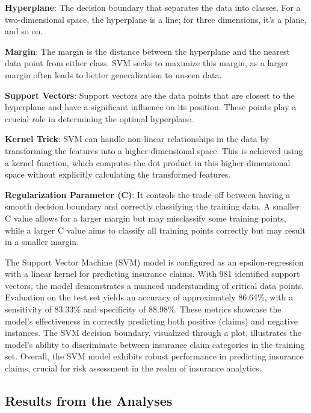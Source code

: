 \documentclass[
]{article}
\begin{document}
\textbf{Hyperplane}: The decision boundary that separates the data into
classes. For a two-dimensional space, the hyperplane is a line; for
three dimensions, it's a plane, and so on.

\textbf{Margin}: The margin is the distance between the hyperplane and
the nearest data point from either class. SVM seeks to maximize this
margin, as a larger margin often leads to better generalization to
unseen data.

\textbf{Support Vectors}: Support vectors are the data points that are
closest to the hyperplane and have a significant influence on its
position. These points play a crucial role in determining the optimal
hyperplane.

\textbf{Kernel Trick}: SVM can handle non-linear relationships in the
data by transforming the features into a higher-dimensional space. This
is achieved using a kernel function, which computes the dot product in
this higher-dimensional space without explicitly calculating the
transformed features.

\textbf{Regularization Parameter (C)}: It controls the trade-off between
having a smooth decision boundary and correctly classifying the training
data. A smaller C value allows for a larger margin but may misclassify
some training points, while a larger C value aims to classify all
training points correctly but may result in a smaller margin.

The Support Vector Machine (SVM) model is configured as an
epsilon-regression with a linear kernel for predicting insurance claims.
With 981 identified support vectors, the model demonstrates a nuanced
understanding of critical data points. Evaluation on the test set yields
an accuracy of approximately 86.64\%, with a sensitivity of 83.33\% and
specificity of 88.98\%. These metrics showcase the model's effectiveness
in correctly predicting both positive (claims) and negative instances.
The SVM decision boundary, visualized through a plot, illustrates the
model's ability to discriminate between insurance claim categories in
the training set. Overall, the SVM model exhibits robust performance in
predicting insurance claims, crucial for risk assessment in the realm of
insurance analytics.

\hypertarget{results-from-the-analyses}{%
\subsection{Results from the Analyses}\label{results-from-the-analyses}}
\end{document}
